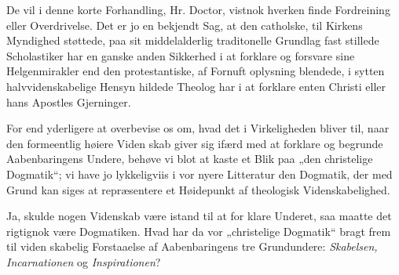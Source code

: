 \documentclass[12pt,a4paper]{article}
\begin{document}
De vil i denne korte Forhandling, Hr. Doctor, vistnok
hverken finde Fordreining eller Overdrivelse. Det er jo en
bekjendt Sag, at den catholske, til Kirkens Myndighed støttede,
paa sit middelalderlig traditonelle Grundlag fast stillede%
Scholastiker har en ganske anden Sikkerhed i at forklare og
forsvare sine Helgenmirakler end den protestantiske, af Fornuft\-%
oplysning blendede, i sytten halvvidenskabelige Hensyn hildede
Theolog har i at forklare enten Christi eller hans Apostles
Gjerninger.

For end yderligere at overbevise os om, hvad det i
Virkeligheden bliver til, naar den formeentlig høiere Viden\-%
skab giver sig ifærd med at forklare og begrunde Aabenbaringens
Undere, behøve vi blot at kaste et Blik paa „den christelige
Dogmatik“; vi have jo lykkeligviis i vor nyere Litteratur
den Dogmatik, der med Grund kan siges at repræsentere et
Høidepunkt af theologisk Videnskabelighed.

Ja, skulde nogen Videnskab være istand til at for\-%
klare Underet, saa maatte det rigtignok være Dogmatiken.
Hvad har da vor „christelige Dogmatik“ bragt frem til viden\-%
skabelig Forstaaelse af Aabenbaringens tre Grundundere:
\emph{Skabelsen, Incarnationen} og \emph{Inspirationen}?
\end{document}
